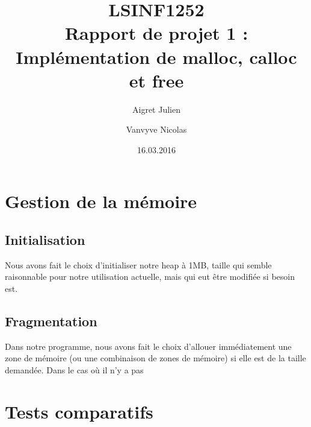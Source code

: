 \documentclass[10pt,a4paper]{article}
\author{Aigret Julien\and Vanvyve Nicolas}
\date{16.03.2016}
\title{LSINF1252\\Rapport de projet 1 :\\Implémentation de malloc, calloc et free}
\begin{document}
\maketitle

\section{Gestion de la mémoire}
\subsection{Initialisation}
Nous avons fait le choix d'initialiser notre heap à 1MB, taille qui semble raisonnable pour notre utilisation actuelle, mais qui eut être modifiée si besoin est.

\subsection{Fragmentation}
Dans notre programme, nous avons fait le choix d'allouer immédiatement une zone de mémoire (ou une combinaison de zones de mémoire) si elle est de la taille demandée. Dans le cas où il n'y a pas
\section{Tests comparatifs}





\end{document}

